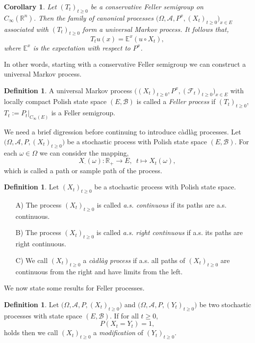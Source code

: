 \documentclass[a4paper, 12pt]{report}
\newtheorem{corollary}[theorem]{Corollary}
\theoremstyle{remark}
\theoremstyle{definition}
\newtheorem{definition}[theorem]{Definition}
\begin{document}
\begin{corollary}
Let $(T_t)_{t \ge 0}$ be a conservative Feller semigroup on\\$C_\infty(\mathbb{R}^n)$.  Then the family of canonical processes $\big(\Omega, \mathcal{A}, P^x, (X_t)_{t \ge 0}\big)_{x \in E}$\\associated with $(T_t)_{t \ge 0}$ form a universal Markov process.  It follows that,
$$
T_tu(x) = \mathbb{E}^x(u\circ X_t),
$$
where $\mathbb{E}^x$ is the expectation with respect to $P^x$.
\end{corollary}
In other words, starting with a conservative Feller semigroup we can construct a universal Markov process.

\begin{definition}
A universal Markov process $\big((X_t)_{t \ge 0}, P^x, (\mathcal{F}_t)_{t \ge 0}\big)_{x \in E}$ with locally compact Polish state space $(E, \mathcal{B})$ is called a \emph{Feller process} if $(T_t)_{t \ge 0}$, $T_t := P_t|_{C_\infty(E)}$ is a Feller semigroup.
\end{definition}

We need a brief digression before continuing to introduce c\`adl\`ag processes.  Let $\big(\Omega, \mathcal{A}, P, (X_t)_{t \ge 0}\big)$ be a stochastic process with Polish state space $(E, \mathcal{B})$.  For each $\omega \in \Omega$ we can consider the mapping,
$$
X_\cdot(\omega) : \mathbb{R}_+ \to E, \,\,\, t \mapsto X_t(\omega),
$$
which is called a path or sample path of the process.

\begin{definition}
Let $(X_t)_{t \ge 0}$ be a stochastic process with Polish state space.
\begin{itemize}
\item[A)] The process $(X_t)_{t \ge 0}$ is called \emph{a.s. continuous} if its paths are a.s. continuous.

\item[B)] The process $(X_t)_{t \ge 0}$ is called \emph{a.s. right continuous} if a.s. its paths are right continuous.

\item[C)] We call $(X_t)_{t \ge 0}$ a \emph{c\`adl\`ag process} if a.s. all paths of $(X_t)_{t \ge 0}$ are continuous from the right and have limits from the left.
\end{itemize}
\end{definition}
We now state some results for Feller processes.

\begin{definition}
Let $\big(\Omega, \mathcal{A}, P, (X_t)_{t \ge 0}\big)$ and $\big(\Omega, \mathcal{A}, P, (Y_t)_{t \ge 0}\big)$ be two sto\-chastic processes with state space $(E, \mathcal{B})$.  If for all $t \ge 0$,
$$
P(X_t = Y_t) = 1,
$$
holds then we call $(X_t)_{t \ge 0}$ a \emph{modification} of $(Y_t)_{t \ge 0}$.
\end{definition}
\end{document}
